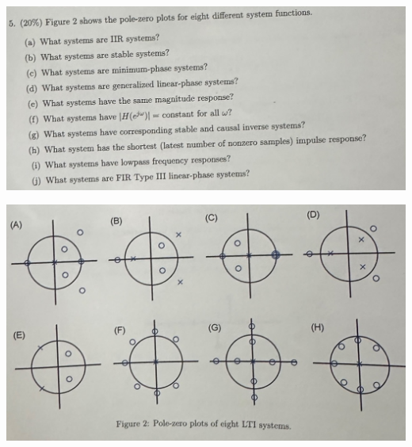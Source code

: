 \documentclass[a4paper]{article}
\begin{document}
	\begin{center}
		\includegraphics[width=1.25\linewidth]{screenshot012}
	\end{center}
	\begin{center}
		\includegraphics[width=1.25\linewidth]{screenshot013}
	\end{center}
	
	
	
	
	
\end{document}
